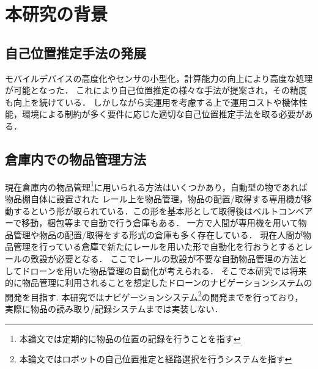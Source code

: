 \section{本研究の背景}
\label{background}
\subsection{自己位置推定手法の発展}
モバイルデバイスの高度化やセンサの小型化，計算能力の向上により高度な処理が可能となった．
これにより自己位置推定の様々な手法が提案され，その精度も向上を続けている．
しかしながら実運用を考慮する上で運用コストや機体性能，環境による制約が多く要件に応じた適切な自己位置推定手法を取る必要がある．

\subsection{倉庫内での物品管理方法}
現在倉庫内の物品管理\footnote{本論文では定期的に物品の位置の記録を行うことを指す}に用いられる方法はいくつかあり，自動型の物であれば物品棚自体に設置された
レール上を物品管理，物品の配置/取得する専用機が移動するという形が取られている．この形を基本形として取得後はベルトコンベアーで移動，梱包等まで自動で行う倉庫もある．
一方で人間が専用機を用いて物品管理や物品の配置/取得をする形式の倉庫も多く存在している．
現在人間が物品管理を行っている倉庫で新たにレールを用いた形で自動化を行おうとするとレールの敷設が必要となる．
ここでレールの敷設が不要な自動物品管理の方法としてドローンを用いた物品管理の自動化が考えられる．
そこで本研究では将来的に物品管理に利用されることを想定したドローンのナビゲーションシステムの開発を目指す.
本研究ではナビゲーションシステム\footnote{本論文ではロボットの自己位置推定と経路選択を行うシステムを指す}の開発までを行っており，
実際に物品の読み取り/記録システムまでは実装しない．


